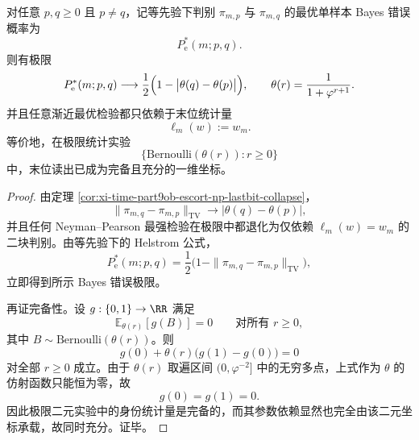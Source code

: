 \begin{theorem}\label{thm:xi-time-part9s-escort-bayes-lastbit-completeness}
对任意 \(p,q\ge 0\) 且 \(p\neq q\)，记等先验下判别 \(\pi_{m,p}\) 与 \(\pi_{m,q}\) 的最优单样本 Bayes 错误概率为
\[
P_{\mathrm e}^\ast(m;p,q).
\]
则有极限
\[
P_{\mathrm e}^\ast(m;p,q)
\longrightarrow
\frac12\Bigl(1-\bigl|\theta(q)-\theta(p)\bigr|\Bigr),
\qquad
\theta(r)=\frac{1}{1+\varphi^{r+1}}.
\]
并且任意渐近最优检验都只依赖于末位统计量
\[
\ell_m(w):=w_m.
\]
等价地，在极限统计实验
\[
\{\mathrm{Bernoulli}(\theta(r)):r\ge 0\}
\]
中，末位读出已成为完备且充分的一维坐标。
\end{theorem}
\begin{proof}
由定理 \ref{cor:xi-time-part9ob-escort-np-lastbit-collapse}，
\[
\|\pi_{m,q}-\pi_{m,p}\|_{\mathrm{TV}}
\longrightarrow
\bigl|\theta(q)-\theta(p)\bigr|,
\]
并且任何 Neyman--Pearson 最强检验在极限中都退化为仅依赖 \(\ell_m(w)=w_m\) 的二块判别。由等先验下的 Helstrom 公式，
\[
P_{\mathrm e}^\ast(m;p,q)
=
\frac12\bigl(1-\|\pi_{m,q}-\pi_{m,p}\|_{\mathrm{TV}}\bigr),
\]
立即得到所示 Bayes 错误极限。

再证完备性。设 \(g:\{0,1\}\to\RR\) 满足
\[
\mathbb E_{\theta(r)}[g(B)]=0
\qquad
\text{对所有 }r\ge 0,
\]
其中 \(B\sim\mathrm{Bernoulli}(\theta(r))\)。则
\[
g(0)+\theta(r)\bigl(g(1)-g(0)\bigr)=0
\]
对全部 \(r\ge 0\) 成立。由于 \(\theta(r)\) 取遍区间 \((0,\varphi^{-2}]\) 中的无穷多点，上式作为 \(\theta\) 的仿射函数只能恒为零，故
\[
g(0)=g(1)=0.
\]
因此极限二元实验中的身份统计量是完备的，而其参数依赖显然也完全由该二元坐标承载，故同时充分。证毕。
\end{proof}

